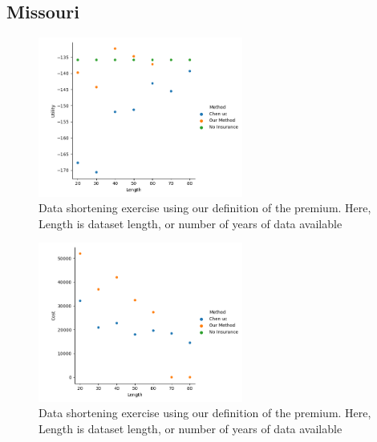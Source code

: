 \documentclass[11pt]{article}
\begin{document}
    \subsection{Missouri}
    \begin{figure}[h]
        \centering
        \includegraphics[width=0.6\textwidth]{../../../output/figures/Evaluation/Missouri_Utility_Length_ml1.png}
        \caption{Data shortening exercise using our definition of the premium. Here, Length is dataset length, or number of years of data available}
        \end{figure}
        \FloatBarrier

        \begin{figure}[h]
        \centering
        \includegraphics[width=0.6\textwidth]{../../../output/figures/Evaluation/Missouri_Cost_Length_ml1.png}
        \caption{Data shortening exercise using our definition of the premium. Here, Length is dataset length, or number of years of data available}
        \end{figure}
        \FloatBarrier
\end{document}
